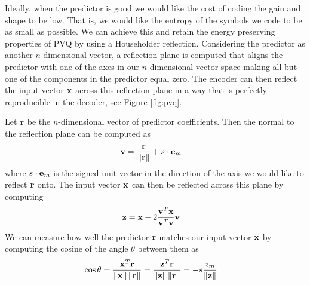 \documentclass[conference, 10pt]{IEEEtran}
\begin{document}
Ideally, when the predictor is good we would like the cost of coding the gain
 and shape to be low.
That is, we would like the entropy of the symbols we code to be as small as
 possible.
We can achieve this and retain the energy preserving properties of PVQ by
 using a Householder reflection.
Considering the predictor as another $n$-dimensional vector, a reflection plane
 is computed that aligns the predictor with one of the axes in our
 $n$-dimensional vector space making all but one of the components in the
 predictor equal zero.
The encoder can then reflect the input vector ${\bf x}$ across this reflection
 plane in a way that is perfectly reproducible in the decoder, see
 Figure \ref{fig:pvq}.

Let ${\bf r}$ be the $n$-dimensional vector of predictor coefficients.  Then the
 normal to the reflection plane can be computed as
\begin{align}
{\bf v} & = \frac{{\bf r}}{\left\|{\bf r}\right\|}+s\cdot {\bf e}_m
\end{align}
where $s\cdot {\bf e}_m$ is the signed unit vector in the direction of the axis we
 would like to reflect ${\bf r}$ onto.
The input vector ${\bf x}$ can then be reflected across this plane by computing
\begin {align}
{\bf z} & = {\bf x}-2\frac{{\bf v}^T {\bf x}}{{\bf v}^T {\bf v}}{\bf v}
\end{align}
We can measure how well the predictor ${\bf r}$ matches our input vector
 ${\bf x}$ by computing the cosine of the angle $\theta$ between them as
\begin{align}
\cos\theta & = \frac{{\bf x}^T {\bf r}}{\left\|{\bf x}\right\| \left\|{\bf r}\right\|}
 = \frac{{\bf z}^T {\bf r}}{\left\|{\bf z}\right\| \left\|{\bf r}\right\|}
 = -s\frac{z_m}{\left\|{\bf z}\right\|}
\end{align}
\end{document}
